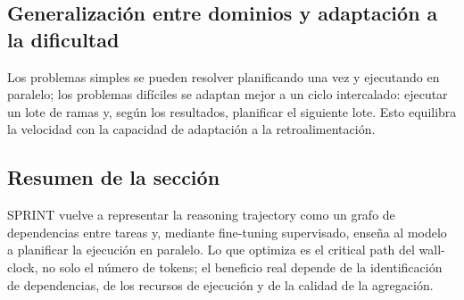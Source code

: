 \subsection{Generalización entre dominios y adaptación a la dificultad}



Los problemas simples se pueden resolver planificando una vez y ejecutando en paralelo; los problemas difíciles se adaptan mejor a un ciclo intercalado: ejecutar un lote de ramas y, según los resultados, planificar el siguiente lote. Esto equilibra la velocidad con la capacidad de adaptación a la retroalimentación.


\subsection{Resumen de la sección}

SPRINT vuelve a representar la reasoning trajectory como un grafo de dependencias entre tareas y, mediante fine-tuning supervisado, enseña al modelo a planificar la ejecución en paralelo. Lo que optimiza es el critical path del wall-clock, no solo el número de tokens; el beneficio real depende de la identificación de dependencias, de los recursos de ejecución y de la calidad de la agregación.
